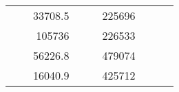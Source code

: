 \begin{table}[H]
\begin{tabular}{|ccrccrccr}
\multicolumn{1}{|c|}{\cellcolor[HTML]{FFFFC7}}                                & \multicolumn{1}{c|}{\cellcolor[HTML]{DAE8FC}}                      & \multicolumn{1}{r|}{\cellcolor[HTML]{DAE8FC}33708.5}   & \multicolumn{1}{c|}{\cellcolor[HTML]{FFFFC7}}                                & \multicolumn{1}{c|}{\cellcolor[HTML]{DAE8FC}}                       & \multicolumn{1}{r|}{\cellcolor[HTML]{DDFDFF}225696}    &                                                                              &                                                                    &                                                        \\ \cline{3-3} \cline{6-6}
\multicolumn{1}{|c|}{\cellcolor[HTML]{FFFFC7}}                                & \multicolumn{1}{c|}{\cellcolor[HTML]{DAE8FC}}                      & \multicolumn{1}{r|}{\cellcolor[HTML]{DDFDFF}105736}    & \multicolumn{1}{c|}{\cellcolor[HTML]{FFFFC7}}                                & \multicolumn{1}{c|}{\cellcolor[HTML]{DAE8FC}}                       & \multicolumn{1}{r|}{\cellcolor[HTML]{DAE8FC}226533}    &                                                                              &                                                                    &                                                        \\ \cline{3-3} \cline{6-6}
\multicolumn{1}{|c|}{\cellcolor[HTML]{FFFFC7}}                                & \multicolumn{1}{c|}{\cellcolor[HTML]{DAE8FC}}                      & \multicolumn{1}{r|}{\cellcolor[HTML]{DAE8FC}56226.8}   & \multicolumn{1}{c|}{\cellcolor[HTML]{FFFFC7}}                                & \multicolumn{1}{c|}{\cellcolor[HTML]{DAE8FC}}                       & \multicolumn{1}{r|}{\cellcolor[HTML]{DDFDFF}479074}    &                                                                              &                                                                    &                                                        \\ \cline{3-3} \cline{6-6}
\multicolumn{1}{|c|}{\cellcolor[HTML]{FFFFC7}}                                & \multicolumn{1}{c|}{\cellcolor[HTML]{DAE8FC}}                      & \multicolumn{1}{r|}{\cellcolor[HTML]{DDFDFF}16040.9}   & \multicolumn{1}{c|}{\cellcolor[HTML]{FFFFC7}}                                & \multicolumn{1}{c|}{\cellcolor[HTML]{DAE8FC}}                       & \multicolumn{1}{r|}{\cellcolor[HTML]{DAE8FC}425712}    &                                                                              &                                                                    &                                                        \\ \cline{3-3} \cline{6-6}

\end{tabular}
\end{table}
